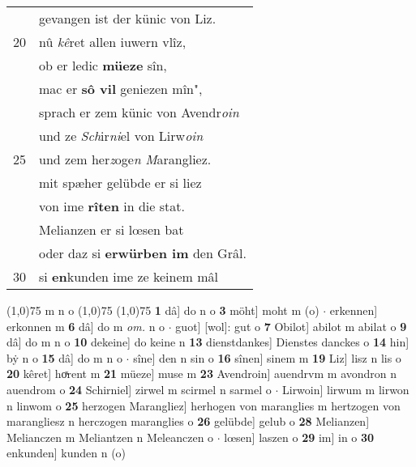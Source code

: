 \documentclass[8pt,a4paper,notitlepage]{article}
\begin{document}
\begin{table}[ht]
\begin{minipage}[t]{0.5\linewidth}
\begin{tabular}{rl}
 & gevangen ist der künic von Liz.\\ 
20 & nû \textit{kê}ret allen iuwern vlîz,\\ 
 & ob er ledic \textbf{müeze} sîn,\\ 
 & mac er \textbf{sô vil} geniezen mîn",\\ 
 & sprach er zem künic von Avendr\textit{oin}\\ 
 & und ze \textit{Sch}ir\textit{ni}el von Lirw\textit{oin}\\ 
25 & und zem her\textit{z}oge\textit{n} \textit{M}arangliez.\\ 
 & mit spæher gelübde er si liez\\ 
 & von ime \textbf{rîten} in die stat.\\ 
 & Melianzen er si lœsen bat\\ 
 & oder daz si \textbf{erwürben im} den Grâl.\\ 
30 & si \textbf{en}kunden ime ze keinem mâl\\ 
\end{tabular}
\scriptsize
\line(1,0){75} \newline
m n o \newline
\line(1,0){75} \newline
\newline
\line(1,0){75} \newline
\textbf{1} dâ] do n o \textbf{3} möht] moht m (o)  $\cdot$ erkennen] erkonnen m \textbf{6} dâ] do m \textit{om.} n o  $\cdot$ guot] [wol]: gut o \textbf{7} Obilot] abilot m abilat o \textbf{9} dâ] do m n o \textbf{10} dekeine] do keine n \textbf{13} dienstdankes] Dienstes danckes o \textbf{14} hin] bẏ n o \textbf{15} dâ] do m n o  $\cdot$ sîne] den n sin o \textbf{16} sînen] sinem m \textbf{19} Liz] lisz n lis o \textbf{20} kêret] hoͯrent m \textbf{21} müeze] muse m \textbf{23} Avendroin] auendrvm m avondron n auendrom o \textbf{24} Schirniel] zirwel m scirmel n sarmel o  $\cdot$ Lirwoin] lirwum m lirwon n linwom o \textbf{25} herzogen Marangliez] herhogen von maranglies m hertzogen von marangliesz n herczogen maranglies o \textbf{26} gelübde] gelub o \textbf{28} Melianzen] Melianczen m Meliantzen n Meleanczen o  $\cdot$ lœsen] laszen o \textbf{29} im] in o \textbf{30} enkunden] kunden n (o) \newline
\end{minipage}
\end{table}
\newpage
\end{document}
